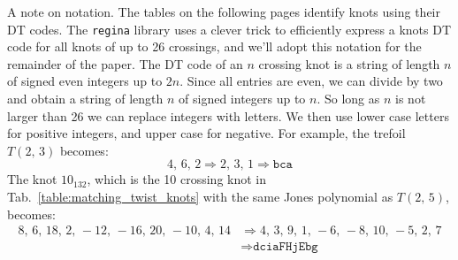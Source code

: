 \documentclass{article}
\theoremstyle{plain}
\begin{document}
        \par\hfill\par
        A note on notation. The tables on the following pages identify knots using their DT
        codes. The \texttt{regina} library \cite{regina} uses a clever trick to efficiently
        express a knots DT code for all knots of up to 26 crossings, and we'll
        adopt this notation for the remainder of the paper. The DT code of an
        $n$ crossing knot is a string of length $n$ of signed even integers up
        to $2n$. Since all entries are even, we can divide by two and obtain
        a string of length $n$ of signed integers up to $n$. So long as $n$ is
        not larger than 26 we can replace integers with letters. We then use
        lower case letters for positive integers, and upper case for negative.
        For example, the trefoil $T(2,\,3)$ becomes:
        \begin{equation}
            4,\,6,\,2
            \Rightarrow
            2,\,3,\,1
            \Rightarrow
            \texttt{bca}
        \end{equation}
        The knot $10_{132}$, which is the 10 crossing knot in
        Tab.~\ref{table:matching_twist_knots} with the same Jones polynomial
        as $T(2,\,5)$, becomes:
        \begin{align}
            8,\,6,\,18,\,2,\,-12,\,-16,\,20,\,-10,\,4,\,14
            &\Rightarrow
            4,\,3,\,9,\,1,\,-6,\,-8,\,10,\,-5,\,2,\,7\\
            &\Rightarrow
            \texttt{dciaFHjEbg}
        \end{align}
\end{document}
